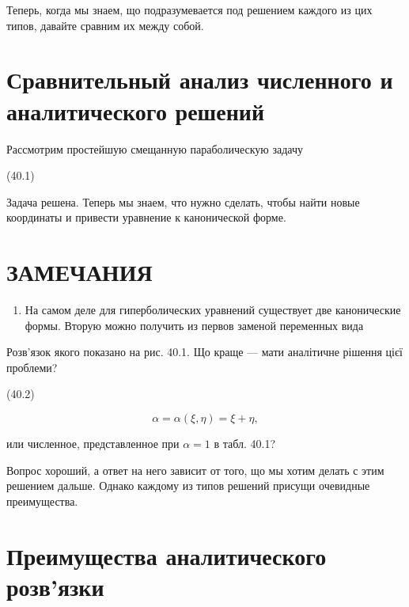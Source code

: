 \documentclass[
  ukrainian,
]{article}
\providecommand{\tightlist}{%
  \setlength{\itemsep}{0pt}\setlength{\parskip}{0pt}}
\begin{document}
Теперь, когда мы знаем, що подразумевается под решением каждого из цих
типов, давайте сравним их между собой.

\section{\texorpdfstring{\textbf{Сравнительный анализ численного} и
аналитического
решений}{Сравнительный анализ численного и аналитического решений}}\label{ux441ux440ux430ux432ux43dux438ux442ux435ux43bux44cux43dux44bux439-ux430ux43dux430ux43bux438ux437-ux447ux438ux441ux43bux435ux43dux43dux43eux433ux43e-ux438-ux430ux43dux430ux43bux438ux442ux438ux447ux435ux441ux43aux43eux433ux43e-ux440ux435ux448ux435ux43dux438ux439}

Рассмотрим простейшую смещанную параболическую задачу

(40.1)

Задача решена. Теперь мы знаем, что нужно сделать, чтобы найти новые
координаты и привести уравнение к канонической форме.

\section{ЗАМЕЧАНИЯ}\label{ux437ux430ux43cux435ux447ux430ux43dux438ux44f}

\begin{enumerate}
\def\labelenumi{\arabic{enumi}.}
\tightlist
\item
  На самом деле для гиперболических уравнений существует две
  канонические формы. Вторую можно получить из первов заменой переменных
  вида
\end{enumerate}

Розв'язок якого показано на рис. 40.1. Що краще --- мати аналітичне
рішення цієї проблеми?

(40.2)

\[
\alpha = \alpha (\xi, \eta) = \xi + \eta,
\]

или численное, представленное при \(\alpha = 1\) в табл. 40.1?

Вопрос хороший, а ответ на него зависит от того, що мы хотим делать с
этим решением дальше. Однако каждому из типов решений присущи очевидные
преимущества.

\section{Преимущества аналитического
розв'язки}\label{ux43fux440ux435ux438ux43cux443ux449ux435ux441ux442ux432ux430-ux430ux43dux430ux43bux438ux442ux438ux447ux435ux441ux43aux43eux433ux43e-ux440ux43eux437ux432ux44fux437ux43aux438}
\end{document}
